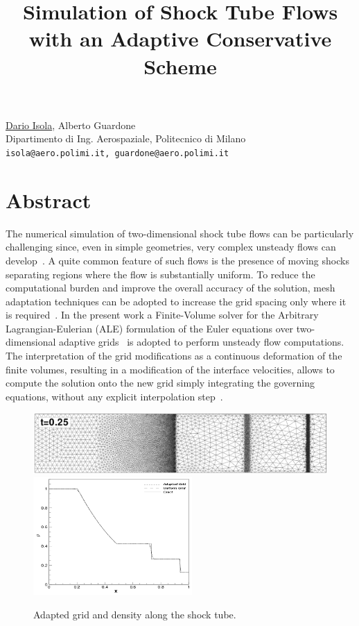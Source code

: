 \title{Simulation of Shock Tube Flows with an Adaptive Conservative Scheme}
\author{} \institute{}
\maketitle

\begin{center}
{\large \underline{Dario Isola}, Alberto Guardone}\\
Dipartimento di Ing. Aerospaziale, Politecnico di Milano\\
{\tt isola@aero.polimi.it, guardone@aero.polimi.it}
\end{center}

\section*{Abstract}
The numerical simulation of two-dimensional shock tube flows can be particularly challenging since, even in simple geometries, very complex unsteady flows can develop~\cite{Woodward-Colella-1984}. A quite common feature of such flows is the presence of moving shocks separating regions where the flow is substantially uniform. To reduce the computational burden and improve the overall accuracy of the solution, mesh adaptation techniques can be adopted to increase the grid spacing only where it is required~\cite{Naderi-Darbandi-Rahni-2010}.  In the present work a Finite-Volume solver for the Arbitrary Lagrangian-Eulerian (ALE) formulation of the Euler equations over two-dimensional adaptive grids~\cite{Forestieri-Isola-Marulli-Guardone-Quaranta-2010} is adopted to perform unsteady flow computations. The interpretation of the grid modifications as a continuous deformation of the finite volumes, resulting in a modification of the interface velocities, allows to compute the solution onto the new grid simply integrating the governing equations, without any explicit interpolation step~\cite{Isola-Guardone-Quaranta-2010}.

\begin{figure}
\centering
\includegraphics[height=.16\textwidth]{./isola/grid.png}
\includegraphics[height=.16\textwidth]{./isola/solution.png}
\caption{Adapted grid and density along the shock tube.}
\end{figure}

